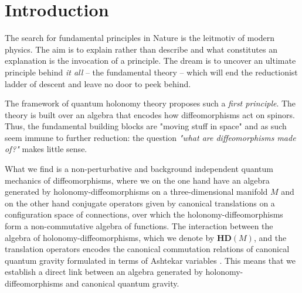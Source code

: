 \documentclass[12pt]{article}
\begin{document}
\section{Introduction}
\setcounter{footnote}{0}



The search for fundamental principles in Nature is the leitmotiv of modern physics. The aim is to explain rather than describe and what constitutes an explanation is the invocation of a principle. %
The dream is to uncover an ultimate principle behind {\it it all} -- the fundamental theory -- which will end the reductionist ladder of descent and leave %
 no door to peek behind. 

The framework of quantum holonomy theory proposes such a {\it first principle}. The theory is built over an algebra that encodes how diffeomorphisms act on spinors. Thus, the fundamental building blocks are "moving stuff in space" and as such seem immune to further reduction: the question {\it "what are diffeomorphisms made of?"} makes little sense. %




What we find is a non-perturbative and background independent  %
quantum mechanics of diffeomorphisms, where we on the one hand have an algebra generated by holonomy-diffeomorphisms on a three-dimensional manifold $M$ and on the other hand conjugate operators given by canonical translations on a configuration space of connections, over which the holonomy-diffeomorphisms form a non-commutative algebra of functions. The interaction between the algebra of holonomy-diffeomorphisms, which we denote by $\mathbf{HD}(M)$, and the translation operators encodes the canonical commutation relations of canonical quantum gravity formulated in terms of Ashtekar variables \cite{Ashtekar:1986yd,Ashtekar:1987gu}. This means that we establish a direct link between an algebra generated by holonomy-diffeomorphisms and canonical quantum gravity.
\end{document}

